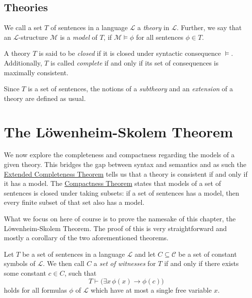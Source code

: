 \documentclass[../../main.tex]{subfiles}
\begin{document}

\subsection{Theories}
\begin{definition}[Theory]\cite[\S.1.2]{Mar02}\cite[\S 1.4]{Cha90}
    We call a set $T$ of sentences in a language $\mathcal{L}$ a \emph{theory} in $\mathcal{L}$.
    Further, we say that an $\mathcal{L}$-structure $\mathcal{M}$ is a \emph{model} of $T$,
    if $\mathcal{M} \models \phi$ for all sentences $\phi \in T$.

    A theory $T$ is said to be \emph{closed} if it is closed under syntactic consequence $\models$.
    Additionally, $T$ is called \emph{complete} if and only if its set of consequences is maximally consistent.

    Since $T$ is a set of sentences, the notions of a \emph{subtheory} and an \emph{extension} of a theory are defined as usual.
\end{definition}

\section{The Löwenheim-Skolem Theorem}

We now explore the completeness and compactness regarding the models of a given theory.
This bridges the gap between syntax and semantics and as such
the \hyperref[completeness-thm]{Extended Completeness Theorem} tells us that a theory is consistent if and only if it has a model.
The \hyperref[compactness-thm]{Compactness Theorem} states that models of a set of sentences is closed under taking subsets:
if a set of sentences has a model, then every finite subset of that set also has a model.

What we focus on here of course is to prove the namesake of this chapter, the Löwenheim-Skolem Theorem.
The proof of this is very straightforward and mostly a corollary of the two aforementioned theorems.

\begin{definition}\label{witness-def}\cite[p.61]{Cha90}
    Let $T$ be a set of sentences in a language $\mathcal{L}$ and let $C \subseteq \mathcal{C}$ be a set of constant symbols of $\mathcal{L}$.
    We then call $C$ a \emph{set of witnesses} for $T$ if and only if there exists some constant $c \in C$, such that
    $$T \vdash \big(\exists x \, \phi(x) \rightarrow \phi(c)\big)$$
    holds for all formulas $\phi$ of $\mathcal{L}$ which have at most a single free variable $x$.
\end{definition}
\end{document}
